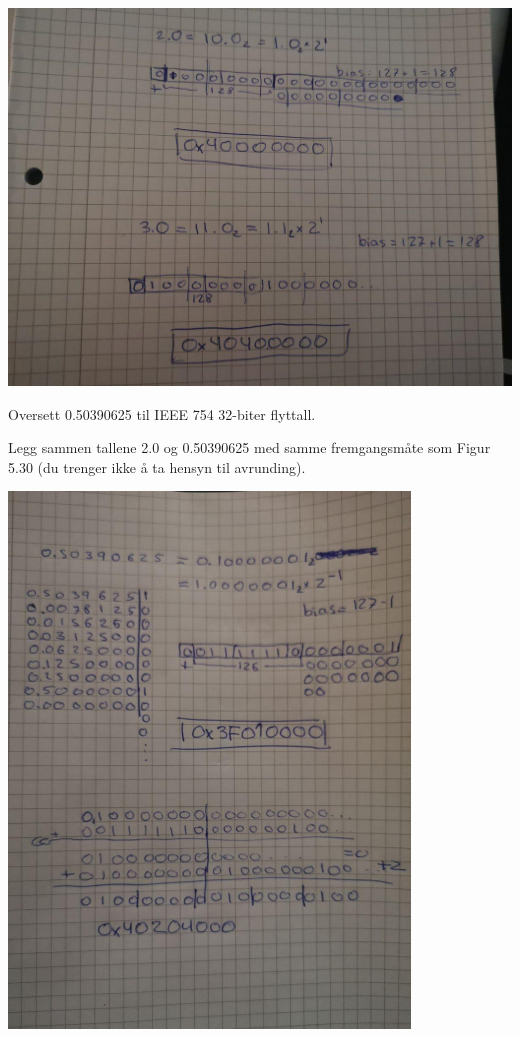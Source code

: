 \documentclass{../../myassignment}
\begin{document}
	\begin{answer}
		\includegraphics[width=1.0\textwidth]{2and3.jpg}

	\end{answer}

	\pagebreak

	\begin{problem}

    	Oversett 0.50390625 til IEEE 754 32-biter flyttall.

		Legg sammen tallene 2.0 og 0.50390625 med samme fremgangsmåte som Figur 5.30 (du trenger ikke å ta hensyn til avrunding).

	\end{problem}

	\begin{answer}
		\includegraphics[width=0.8\textwidth]{weirdandsumm.jpg}

	\end{answer}
\end{document}

